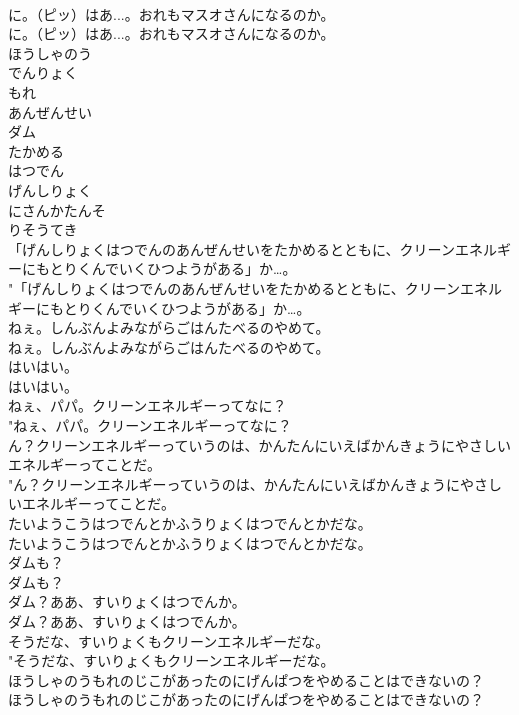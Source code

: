 \documentclass[8pt]{extreport}
\begin{document}
\begin{CJK}{UTF8}{min}
\\	に。（ピッ）はあ...。おれもマスオさんになるのか。	
\\	に。（ピッ）はあ...。おれもマスオさんになるのか。 
\\	ほうしゃのう
\\	でんりょく
\\	もれ
\\	あんぜんせい
\\	ダム
\\	たかめる
\\	はつでん
\\	げんしりょく
\\	にさんかたんそ
\\	りそうてき
\\	「げんしりょくはつでんのあんぜんせいをたかめるとともに、クリーンエネルギーにもとりくんでいくひつようがある」か…。	
\\	"「げんしりょくはつでんのあんぜんせいをたかめるとともに、クリーンエネルギーにもとりくんでいくひつようがある」か…。 
\\	ねぇ。しんぶんよみながらごはんたべるのやめて。	
\\	ねぇ。しんぶんよみながらごはんたべるのやめて。 
\\	はいはい。	
\\	はいはい。 
\\	ねぇ、パパ。クリーンエネルギーってなに？	
\\	"ねぇ、パパ。クリーンエネルギーってなに？ 
\\	ん？クリーンエネルギーっていうのは、かんたんにいえばかんきょうにやさしいエネルギーってことだ。	
\\	"ん？クリーンエネルギーっていうのは、かんたんにいえばかんきょうにやさしいエネルギーってことだ。 
\\	たいようこうはつでんとかふうりょくはつでんとかだな。	
\\	たいようこうはつでんとかふうりょくはつでんとかだな。 
\\	ダムも？	
\\	ダムも？ 
\\	ダム？ああ、すいりょくはつでんか。	
\\	ダム？ああ、すいりょくはつでんか。 
\\	そうだな、すいりょくもクリーンエネルギーだな。	
\\	"そうだな、すいりょくもクリーンエネルギーだな。 
\\	ほうしゃのうもれのじこがあったのにげんぱつをやめることはできないの？	
\\	ほうしゃのうもれのじこがあったのにげんぱつをやめることはできないの？ 

\end{CJK}
\end{document}
